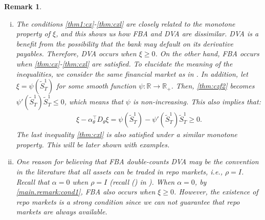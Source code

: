 \documentclass[a4paper, 11pt]{article}              %
\numberwithin{equation}{section}
\theoremstyle{plain}
\newcommand{\1}{\mathds{1}}
\newcommand{\St}{\tilde{S}}
\newcommand{\dsR}{\mathbb{R}}
\theoremstyle{plain}
\theoremstyle{definition}
\newtheorem{remark}[thm]{Remark} %
\theoremstyle{plain}
\newtheorem{remark}{Remark}
\newcommand{\rom}[1]{\lowercase\expandafter{\romannumeral #1\relax}}
\begin{document}
\begin{remark}\label{main.remark}
  \begin{enumerate}[(i)]
  \item The conditions \cref{thm1:cx}-\cref{thm:cxl} are closely related to the
    monotone property of $\xi$, and this shows us how FBA and DVA are dissimilar.
    DVA is a benefit from the possibility that the bank may default on its
    derivative payables. Therefore, DVA occurs when $\xi \geq0$. On the other hand, FBA
    occurs when \cref{thm:cx}-\cref{thm:cxl} are satisfied. To elucidate the
    meaning of the inequalities, we consider the same financial market as in
    . In addition, let $\xi = \psi(\St^1_T)$ for some smooth
    function $\psi \colon \dsR \to \dsR_+$. Then, \cref{thm:czf2} becomes
    $ \psi'(\St^1_T) \St^1_T \leq0$, which means that $\psi$ is non-increasing. This also
    implies that:
  \begin{align}
    \xi -\alpha_\theta^\top D_\theta \xi = \psi(\St^1_T) - \psi'(\St^1_T) \St^1_T \geq0. \label{main.remark:cond1}
  \end{align}
  The last inequality \cref{thm:cxl} is also satisfied under a similar monotone
  property.
  This will be later shown with examples. 
\item One reason for believing that FBA double-counts DVA may be the
  convention in the literature that all assets can be traded in repo markets, i.e.,
  $\rho = I$. Recall that $\alpha = 0$ when $\rho = I$ (recall (\rom{1}) in
  ). When $\alpha = 0$, by \cref{main.remark:cond1}, FBA also
  occurs when $\xi \geq0$. However, the existence of repo markets is a strong
  condition since we can not guarantee that repo markets are always available.
  \end{enumerate}
\end{remark}
\end{document}
